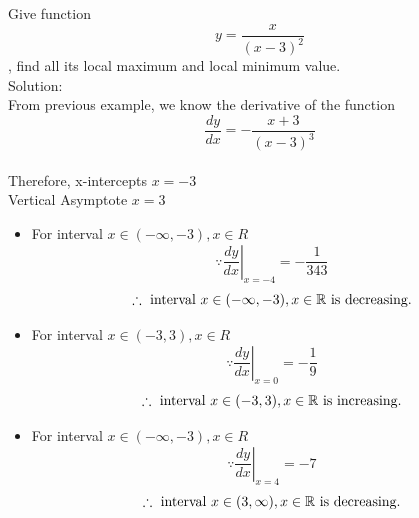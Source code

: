 \begin{example}
    Give function $$y = \frac{x}{(x - 3)^2}$$, find all its local maximum and local minimum value.\\

    \noindent Solution:\\

    From previous example, we know the derivative of the function $$\frac{dy}{dx} = -\frac{
        x + 3
    }{(x - 3)^3}$$\\
    \indent Therefore, x-intercepts $x = -3$\\
    \indent Vertical Asymptote $x = 3$

    \begin{itemize}
        \item For interval $x \in (-\infty, -3), x \in R$
        $$\because \left . \frac{dy}{dx} \right |_{x = -4} = -\frac{1}{343}$$
        $$\therefore \text{ interval } x \in (-\infty, -3), x \in \mathbb{R} \text{ is decreasing.}$$
        \item For interval $x \in (-3, 3), x \in R$
        $$\because \left . \frac{dy}{dx} \right |_{x = 0}= -\frac{1}{9}$$
        $$\therefore \text{ interval } x \in (-3, 3), x \in \mathbb{R} \text{ is increasing.}$$
        \item For interval $x \in (-\infty, -3), x \in R$
        $$\because \left . \frac{dy}{dx} \right |_{x = 4} = -7$$
        $$\therefore \text{ interval } x \in (3, \infty), x \in \mathbb{R} \text{ is decreasing.}$$
    \end{itemize}
\end{example}